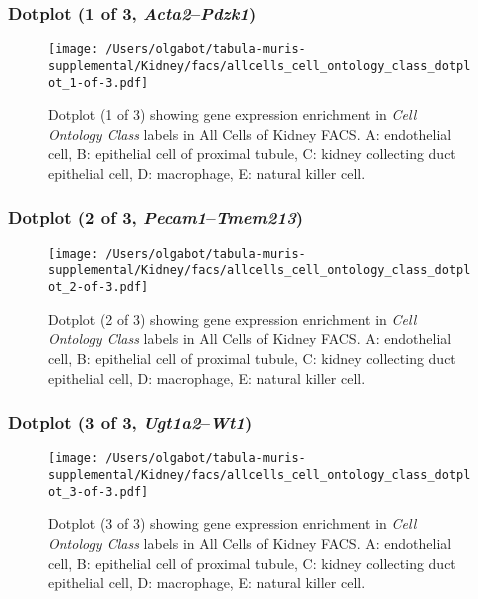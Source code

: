 \clearpage

\subsubsection{Dotplot (1 of 3, \emph{Acta2}--\emph{Pdzk1})}
\begin{figure}[h]
\centering
\texttt{[image: /Users/olgabot/tabula-muris-supplemental/Kidney/facs/allcells\_cell\_ontology\_class\_dotplot\_1-of-3.pdf]}

\caption{ Dotplot (1 of 3)  showing gene expression enrichment in \emph{Cell Ontology Class} labels in All Cells of Kidney FACS. A: endothelial cell, B: epithelial cell of proximal tubule, C: kidney collecting duct epithelial cell, D: macrophage, E: natural killer cell.}
\end{figure}


\clearpage

\subsubsection{Dotplot (2 of 3, \emph{Pecam1}--\emph{Tmem213})}
\begin{figure}[h]
\centering
\texttt{[image: /Users/olgabot/tabula-muris-supplemental/Kidney/facs/allcells\_cell\_ontology\_class\_dotplot\_2-of-3.pdf]}

\caption{ Dotplot (2 of 3)  showing gene expression enrichment in \emph{Cell Ontology Class} labels in All Cells of Kidney FACS. A: endothelial cell, B: epithelial cell of proximal tubule, C: kidney collecting duct epithelial cell, D: macrophage, E: natural killer cell.}
\end{figure}


\clearpage

\subsubsection{Dotplot (3 of 3, \emph{Ugt1a2}--\emph{Wt1})}
\begin{figure}[h]
\centering
\texttt{[image: /Users/olgabot/tabula-muris-supplemental/Kidney/facs/allcells\_cell\_ontology\_class\_dotplot\_3-of-3.pdf]}

\caption{ Dotplot (3 of 3)  showing gene expression enrichment in \emph{Cell Ontology Class} labels in All Cells of Kidney FACS. A: endothelial cell, B: epithelial cell of proximal tubule, C: kidney collecting duct epithelial cell, D: macrophage, E: natural killer cell.}
\end{figure}


